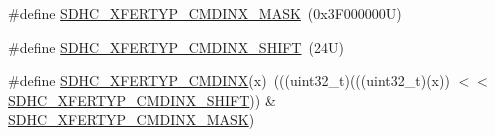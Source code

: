 \begin{DoxyCompactItemize}
\item 
\#define \mbox{\hyperlink{group___s_d_h_c___register___masks_ga38c578078fbe7eae9b211d4e75eb9dd0}{S\+D\+H\+C\+\_\+\+X\+F\+E\+R\+T\+Y\+P\+\_\+\+C\+M\+D\+I\+N\+X\+\_\+\+M\+A\+SK}}~(0x3\+F000000\+U)
\item 
\#define \mbox{\hyperlink{group___s_d_h_c___register___masks_ga3ff92ff3a2de4c2006862e08e92198a2}{S\+D\+H\+C\+\_\+\+X\+F\+E\+R\+T\+Y\+P\+\_\+\+C\+M\+D\+I\+N\+X\+\_\+\+S\+H\+I\+FT}}~(24\+U)
\item 
\#define \mbox{\hyperlink{group___s_d_h_c___register___masks_ga14109a758d3ca3014df09696919ba77a}{S\+D\+H\+C\+\_\+\+X\+F\+E\+R\+T\+Y\+P\+\_\+\+C\+M\+D\+I\+NX}}(x)~(((uint32\+\_\+t)(((uint32\+\_\+t)(x)) $<$$<$ \mbox{\hyperlink{group___s_d_h_c___register___masks_ga3ff92ff3a2de4c2006862e08e92198a2}{S\+D\+H\+C\+\_\+\+X\+F\+E\+R\+T\+Y\+P\+\_\+\+C\+M\+D\+I\+N\+X\+\_\+\+S\+H\+I\+FT}})) \& \mbox{\hyperlink{group___s_d_h_c___register___masks_ga38c578078fbe7eae9b211d4e75eb9dd0}{S\+D\+H\+C\+\_\+\+X\+F\+E\+R\+T\+Y\+P\+\_\+\+C\+M\+D\+I\+N\+X\+\_\+\+M\+A\+SK}})
\end{DoxyCompactItemize}
